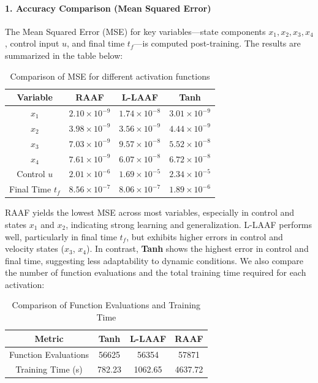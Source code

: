 \paragraph{1. Accuracy Comparison (Mean Squared Error)}
The Mean Squared Error (MSE) for key variables—state components \(x_1, x_2, x_3, x_4\), control input \(u\), and final time \(t_f\)—is computed post-training. The results are summarized in the table below:

\begin{table}[H]
\centering
\caption{Comparison of MSE for different activation functions}
\begin{tabular}{|c|c|c|c|}
\hline
\textbf{Variable} & \textbf{RAAF}& \textbf{L-LAAF} & \textbf{Tanh} \\
\hline
\(x_1\) & \(2.10 \times 10^{-9}\) & \(1.74 \times 10^{-8}\) & \(3.01 \times 10^{-9}\) \\
\(x_2\) & \(3.98 \times 10^{-9}\) & \(3.56 \times 10^{-9}\) & \(4.44 \times 10^{-9}\) \\
\(x_3\) & \(7.03 \times 10^{-9}\) & \(9.57 \times 10^{-8}\) & \(5.52 \times 10^{-8}\) \\
\(x_4\) & \(7.61 \times 10^{-9}\) & \(6.07 \times 10^{-8}\) & \(6.72 \times 10^{-8}\) \\
Control \(u\)& \(2.01 \times 10^{-6}\) & \(1.69 \times 10^{-5}\) & \(2.34 \times 10^{-5}\) \\
Final Time \(t_f\) & \(8.56 \times 10^{-7}\) & \(8.06 \times 10^{-7}\) & \(1.89 \times 10^{-6}\) \\
\hline
\end{tabular}
\end{table}

RAAF yields the lowest MSE across most variables, especially in control and states \(x_1\) and \(x_2\), indicating strong learning and generalization. L-LAAF performs well, particularly in final time \(t_f\), but exhibits higher errors in control and velocity states (\(x_3\), \(x_4\)). In contrast, \textbf{Tanh} shows the highest error in control and final time, suggesting less adaptability to dynamic conditions.
We also compare the number of function evaluations and the total training time required for each activation:

\begin{table}[H]
\centering
\caption{Comparison of Function Evaluations and Training Time}
\begin{tabular}{|c|c|c|c|}
\hline
\textbf{Metric} & \textbf{Tanh} & \textbf{L-LAAF} & \textbf{RAAF}\\
\hline
Function Evaluations & 56625 & 56354 & 57871 \\
Training Time (s) & 782.23 & 1062.65 & 4637.72 \\
\hline
\end{tabular}
\end{table}

